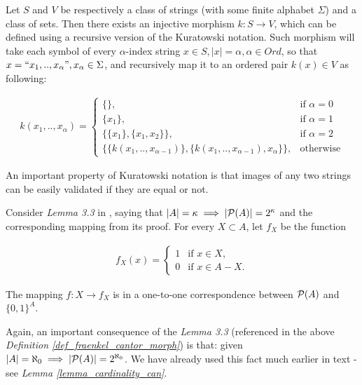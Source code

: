 \begin{definition}\label{def_kuratowski_morph}

  Let $S$ and $V$ be respectively a class of strings (with some finite alphabet $\Sigma$) and a class of sets. Then there exists an injective morphism $k: S \to V$, which can be defined using a recursive version of the Kuratowski notation. Such morphism will take each symbol of every $\alpha$-index string $x \in S, |x| = \alpha, \alpha \in Ord$, so that $x = \text{``} x_1,..,x_\alpha \text{''}, x_\alpha \in \Sigma$, and recursively map it to an ordered pair $k(x) \in V$ as following:

  \begin{align*}
    k(x_1,..,x_\alpha)=\left\{
      \begin{array}{ll}
        \{\}, & \mbox{if $\alpha=0$}\\
        \big\{x_1\big\}, & \mbox{if $\alpha=1$}\\
        \big\{\{x_1\},\{x_1, x_2\}\big\}, & \mbox{if $\alpha=2$}\\
        \big\{\{k(x_1,..,x_{\alpha-1})\},\{k(x_1,..,x_{\alpha-1}), x_\alpha\}\big\}, & \mbox{otherwise}
      \end{array}
    \right.
  \end{align*}

  An important property of Kuratowski notation is that images of any two strings can be easily validated if they are equal or not.
\end{definition}

\begin{definition}\label{def_fraenkel_cantor_morph}
  Consider \textit{Lemma 3.3} in \cite{jech2003set}, saying that $|A|=\kappa \implies |\mathcal{P}(A)| = 2^\kappa$ and the corresponding mapping from its proof. For every $X \subset A$, let $f_X$ be the function 

  \begin{align*}
    f_X(x)=\left\{
      \begin{array}{ll}
        1 & \mbox{if $x \in X$,}\\
        0 & \mbox{if $x \in A - X$.}
      \end{array}
    \right.
  \end{align*}
  
  The mapping $f: X \to f_X$ is in a one-to-one correspondence between $\mathcal{P}(A)$ and $\{0,1\}^A$. 
\end{definition}

Again, an important consequence of the \textit{Lemma 3.3} (referenced in the above \textit{Definition \ref{def_fraenkel_cantor_morph}}) is that: given $|A| = \aleph_0 \implies |\mathcal{P}(A)| = 2^{\aleph_0}$. We have already used this fact much earlier in text - see \textit{Lemma \ref{lemma_cardinality_can}}.

